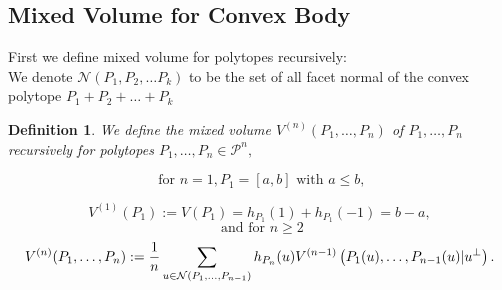 \documentclass[oneside]{book}
\newtheorem{mydef}{Definition}[section]
\begin{document}
	\subsection{Mixed Volume for Convex Body}
	\label{ss:20.5}
	First we define mixed volume for polytopes recursively:  \\
	We denote  $ \mathcal{N}(P_{1},P_{2},\ldots P_{k})$ to be the set of all facet normal of the convex polytope $P_{1}+P_{2}+ \ldots + P_{k}$
	\begin{mydef} \label{d:18}
		We define the mixed volume $V^{(n)}\left(P_{1}, \ldots, P_{n}\right)$ of $P_{1}, \ldots, P_{n}$ recursively for polytopes $P_{1}, \ldots, P_{n} \in \mathcal{P}^{n},$ 
		
		$$ \text{ for } n = 1, P_{1}=[a, b] \text { with } a \leq b,$$ 
		
		\begin{equation}
			\label{eq49}
			V^{(1)}\left(P_{1}\right):=V\left(P_{1}\right)=h_{P_{1}}(1)+h_{P_{1}}(-1) = b - a,  
		\end{equation} 
		$$\text{ and} \text { for } n \geq 2 $$ 
		\begin{equation} \label{eq50}
			\\
			V^{(n)}(P_{1}, \ldots, P_{n}):=\frac{1}{n} \sum_{u \in \mathcal{N}(P_{1}, \ldots, P_{n-1})} h_{P_{n}}(u) V^{(n-1)}\left(P_{1}(u), \ldots, P_{n-1}(u)| u^{\perp}\right).
		\end{equation}
	\end{mydef}     
\end{document}
